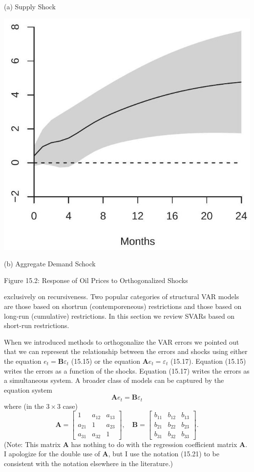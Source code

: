 \documentclass[10pt]{article}
\begin{document}
(a) Supply Shock

\includegraphics[max width=\textwidth]{2022_10_23_7c0e31a459390f548ae3g-23(1)}

(b) Aggregate Demand Schock

Figure 15.2: Response of Oil Prices to Orthogonalized Shocks

exclusively on recursiveness. Two popular categories of structural VAR models are those based on shortrun (contemporeneous) restrictions and those based on long-run (cumulative) restrictions. In this section we review SVARs based on short-run restrictions.

When we introduced methods to orthogonalize the VAR errors we pointed out that we can represent the relationship between the errors and shocks using either the equation $e_{t}=\boldsymbol{B} \varepsilon_{t}$ (15.15) or the equation $\boldsymbol{A} e_{t}=\varepsilon_{t}$ (15.17). Equation (15.15) writes the errors as a function of the shocks. Equation (15.17) writes the errors as a simultaneous system. A broader class of models can be captured by the equation system
$$
\boldsymbol{A} e_{t}=\boldsymbol{B} \varepsilon_{t}
$$
where (in the $3 \times 3$ case)
$$
\boldsymbol{A}=\left[\begin{array}{ccc}
1 & a_{12} & a_{13} \\
a_{21} & 1 & a_{23} \\
a_{31} & a_{32} & 1
\end{array}\right], \quad \boldsymbol{B}=\left[\begin{array}{lll}
b_{11} & b_{12} & b_{13} \\
b_{21} & b_{22} & b_{23} \\
b_{31} & b_{32} & b_{33}
\end{array}\right] .
$$
(Note: This matrix $\boldsymbol{A}$ has nothing to do with the regression coefficient matrix $\boldsymbol{A}$. I apologize for the double use of $\boldsymbol{A}$, but I use the notation (15.21) to be consistent with the notation elsewhere in the literature.)
\end{document}

